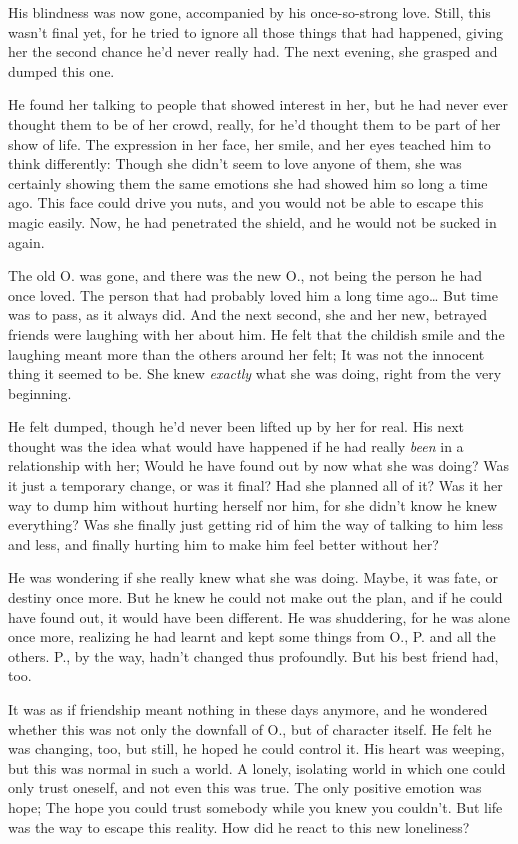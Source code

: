 His blindness was now gone, accompanied by his once-so-strong love. Still, this wasn't final yet, for he tried to ignore all those things that had happened, giving her the second chance he'd never really had. 
The next evening, she grasped and dumped this one.

He found her talking to people that showed interest in her, but he had never ever thought them to be of her crowd, really, for he'd thought them to be part of her show of life. The expression in her face, her smile, and her eyes teached him to think differently: Though she didn't seem to love anyone of them, she was certainly showing them the same emotions she had showed him so long a time ago. This face could drive you nuts, and you would not be able to escape this magic easily. Now, he had penetrated the shield, and he would not be sucked in again.

The old O. was gone, and there was the new O., not being the person he had once loved. The person that had probably loved him a long time ago\ldots
But time was to pass, as it always did. And the next second, she and her new, betrayed friends were laughing with her about him. 
He felt that the childish smile and the laughing meant more than the others around her felt; It was not the innocent thing it seemed to be. She knew \emph{exactly} what she was doing, right from the very beginning.

He felt dumped, though he'd never been lifted up by her for real. His next thought was the idea what would have happened if he had really \emph{been} in a relationship with her; Would he have found out by now what she was doing? Was it just a temporary change, or was it final? Had she planned all of it? Was it her way to dump him without hurting herself nor him, for she didn't know he knew everything? 
Was she finally just getting rid of him the way of talking to him less and less, and finally hurting him to make him feel better without her?

He was wondering if she really knew what she was doing. Maybe, it was fate, or destiny once more. But he knew he could not make out the plan, and if he could have found out, it would have been different. 
He was shuddering, for he was alone once more, realizing he had learnt and kept some things from O., P. and all the others. P., by the way, hadn't changed thus profoundly. 
But his best friend had, too.

It was as if friendship meant nothing in these days anymore, and he wondered whether this was not only the downfall of O., but of character itself. He felt he was changing, too, but still, he hoped he could control it. His heart was weeping, but this was normal in such a world. 
A lonely, isolating world in which one could only trust oneself, and not even this was true. 
The only positive emotion was hope; The hope you could trust somebody while you knew you couldn't. But life was the way to escape this reality. 
How did he react to this new loneliness?

